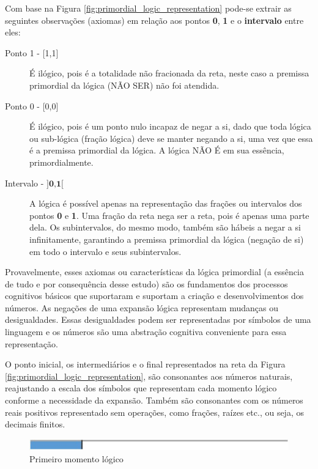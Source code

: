 Com base na Figura \ref{fig:primordial_logic_representation} pode-se extrair as seguintes observações (axiomas) em relação aos pontos \textbf{0}, \textbf{1} e o \textbf{intervalo} entre eles:
	\begin{description}
	   \item[Ponto 1 - {[1,1]}] É ilógico, pois é a totalidade não fracionada da reta, neste caso a premissa primordial da lógica (NÃO SER) não foi atendida.
	   \item[Ponto 0 - {[0,0]}] É ilógico, pois é um ponto nulo incapaz de negar a si, dado que toda lógica ou sub-lógica (fração lógica) deve se manter negando a si, uma vez que essa é a premissa primordial da lógica. A lógica NÃO É em sua essência, primordialmente.
	   \item[Intervalo - $\textbf{{]0,1[}}$] A lógica é possível apenas na representação das frações ou intervalos dos pontos \textbf{0} e \textbf{1}. Uma fração da reta nega ser a reta, pois é apenas uma parte dela. Os subintervalos, do mesmo modo, também são hábeis a negar a si infinitamente, garantindo a premissa primordial da lógica (negação de si) em todo o intervalo e seus subintervalos. 
	\end{description}

Provavelmente, esses axiomas ou características da lógica primordial (a essência de tudo e por consequência desse estudo) são os fundamentos dos processos cognitivos básicos que suportaram e suportam a criação e desenvolvimentos dos números. As negações de uma expansão lógica representam mudanças ou desigualdades. Essas desigualdades podem ser representadas por símbolos de uma linguagem e os números são uma abstração cognitiva conveniente para essa representação. 

O ponto inicial, os intermediários e o final representados na reta da Figura \ref{fig:primordial_logic_representation}, são consonantes aos números naturais, reajustando a escala dos símbolos que representam cada momento lógico conforme a necessidade da expansão. Também são consonantes com os números reais positivos representado sem operações, como frações, raízes etc., ou seja, os decimais finitos.
	\begin{figure}[H]
	\caption{Primeiro momento lógico}
	\label{fig:first_logical_moment}
	\centering
	\includegraphics[scale=1]{sections/images/first_logical_moment.jpg}
	\end{figure}

